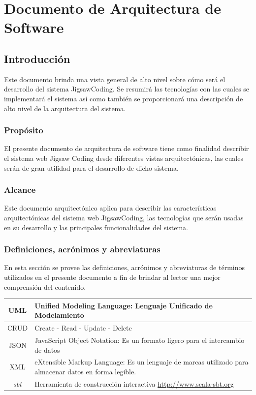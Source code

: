 \chapter{Documento de Arquitectura de Software}
\section{Introducción}
Este documento brinda una vista general de alto nivel sobre cómo será el desarrollo del sistema JigsawCoding. Se resumirá las tecnologías con las cuales se implementará el sistema así como también se proporcionará una descripción de alto nivel de la arquitectura del sistema.
\subsection{Propósito}
El presente documento de arquitectura de software tiene como finalidad describir el sistema web Jigsaw Coding desde diferentes vistas arquitectónicas, las cuales serán de gran utilidad para el desarrollo de dicho sistema.
\subsection{Alcance} Este documento arquitectónico aplica para describir las características arquitectónicas del sistema web JigsawCoding, las tecnologías que serán usadas en su desarrollo y las principales funcionalidades del sistema.
\subsection{Definiciones, acrónimos y abreviaturas}
En esta sección se provee las definiciones, acrónimos y abreviaturas de términos utilizados en el presente documento a fin de brindar al lector una mejor comprensión del contenido. 
\clearpage
\begin{longtable}{|c|L{8cm}|}
    \hline
  UML & Unified Modeling Language: Lenguaje Unificado de Modelamiento \\ \hline
  CRUD & Create - Read - Update - Delete \\ \hline
  JSON & JavaScript Object Notation: Es un formato ligero para el intercambio de datos \\ \hline
  XML & eXtensible Markup Language: Es un lenguaje de marcas utilizado para almacenar datos en forma legible. \\ \hline
  \emph{sbt} & Herramienta de construcción interactiva \url{http://www.scala-sbt.org} \\ \hline
\end{longtable}

